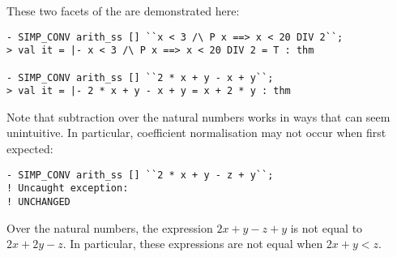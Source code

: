 These two facets of the  \simpset{} are demonstrated
here:
\begin{session}
\begin{verbatim}
- SIMP_CONV arith_ss [] ``x < 3 /\ P x ==> x < 20 DIV 2``;
> val it = |- x < 3 /\ P x ==> x < 20 DIV 2 = T : thm

- SIMP_CONV arith_ss [] ``2 * x + y - x + y``;
> val it = |- 2 * x + y - x + y = x + 2 * y : thm
\end{verbatim}
\end{session}
Note that subtraction over the natural numbers works in ways that can
seem unintuitive.  In particular, coefficient normalisation may not
occur when first expected:
\begin{session}
\begin{verbatim}
- SIMP_CONV arith_ss [] ``2 * x + y - z + y``;
! Uncaught exception:
! UNCHANGED
\end{verbatim}
\end{session}
Over the natural numbers, the expression $2 x + y - z + y$ is not
equal to $2 x + 2 y - z$.  In particular, these expressions are not
equal when $2x + y < z$.

